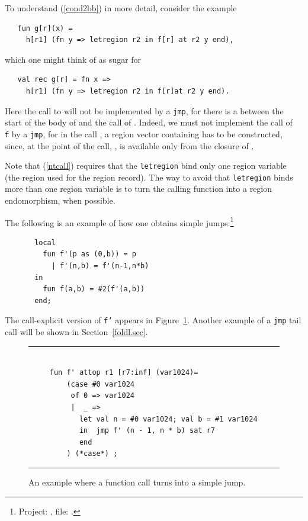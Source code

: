 \documentclass[12pt]{book}
\begin{document}
To understand (\ref{cond2bb}) in more detail, consider the example
\begin{verbatim}
   fun g[r](x) = 
     h[r1] (fn y => letregion r2 in f[r] at r2 y end),
\end{verbatim}
which one might think of as sugar for 
\begin{verbatim}
   val rec g[r] = fn x => 
     h[r1] (fn y => letregion r2 in f[r]at r2 y end).
\end{verbatim}
Here the call to  will not be implemented by a {\tt jmp}, for
there is a  between the start of the body of  and
the call of .  Indeed, we must not implement the call of {\tt
f} by a {\tt jmp}, for in the call ,  
a region vector containing  has to be constructed, since,
at the point of the call, , is available only from the closure
of .


Note that (\ref{ntcall}) requires 
that the {\tt letregion} bind only one region variable (the region used for
the region record). The way to avoid that {\tt letregion} binds more than one region variable 
is to turn the calling function into a region endomorphism, when possible.

The following is an example of how one obtains simple jumps:\footnote{Project: , file: .}
\begin{verbatim}
       local
         fun f'(p as (0,b)) = p
           | f'(n,b) = f'(n-1,n*b)
       in
         fun f(a,b) = #2(f'(a,b))
       end;
\end{verbatim}
The  call-explicit version of {\tt f'} appears in 
Figure~\ref{tail2.fig}. 
Another example of a {\tt jmp} tail call 
will be shown in Section~\ref{foldl.sec}.

\begin{figure}
\hrule
\begin{verbatim}

     fun f' attop r1 [r7:inf] (var1024)= 
         (case #0 var1024 
          of 0 => var1024
          |  _ => 
            let val n = #0 var1024; val b = #1 var1024
            in  jmp f' (n - 1, n * b) sat r7
            end 
         ) (*case*) ; 
\end{verbatim}
\caption{An example where a function call 
         turns into a simple jump.}
\medskip
\hrule
\label{tail2.fig}
\end{figure}
\end{document}
